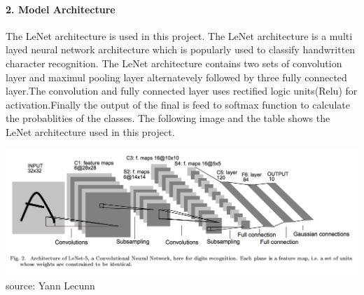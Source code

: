 \documentclass[11pt]{article}
\makeatletter
\def\maxwidth{\ifdim\Gin@nat@width>\linewidth\linewidth
    \else\Gin@nat@width\fi}
\let\Oldincludegraphics\includegraphics
\renewcommand{\includegraphics}[1]{\Oldincludegraphics[width=.8\maxwidth]{#1}}
\makeatother
\begin{document}
\paragraph{2. Model Architecture}\label{model-architecture}

The LeNet architecture is used in this project. The LeNet architecture
is a multi layed neural network architecture which is popularly used to
classify handwritten character recognition. The LeNet architecture
contains two sets of convolution layer and maximul pooling layer
alternatevely followed by three fully connected layer.The convolution
and fully connected layer uses rectified logic units(Relu) for
activation.Finally the output of the final is feed to softmax function
to calculate the probablities of the classes. The following image and
the table shows the LeNet architecture used in this project.

\includegraphics{./LeNet.png} source: Yann Lecunn
\end{document}
